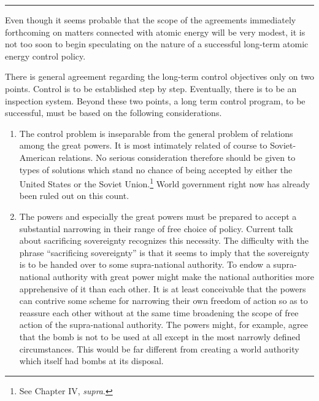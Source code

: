 \noindent\hfil\rule{0.4\textwidth}{.4pt}\hfil

\vspace{4pt}

Even though it seems probable that the scope of the agreements immediately forthcoming on matters connected with atomic energy will be very modest, it is not too soon to begin speculating on the nature of a successful long-term atomic energy control policy.

There is general agreement regarding the long-term control objectives only on two points. Control is to be established step by step. Eventually, there is to be an inspection system. Beyond these two points, a long term control program, to be successful, must be based on the following considerations.

\begin{enumerate}[1.]

\item The control problem is inseparable from the general problem of relations among the great powers. It is most intimately related of course to Soviet-American relations. No serious consideration therefore should be given to types of solutions which stand no chance of being accepted by either the United States or the Soviet Union.\footnote{See Chapter IV, \textit{supra}.} World government right now has already been ruled out on this count.

\item The powers and especially the great powers must be prepared to accept a substantial narrowing in their range of free choice of policy. Current talk about sacrificing sovereignty recognizes this necessity. The difficulty with the phrase ``sacrificing sovereignty'' is that it seems to imply that the sovereignty is to be handed over to some supra-national authority. To endow a supra-national authority with great power might make the national authorities more apprehensive of it than each other. It is at least conceivable that the powers can contrive some scheme for narrowing their own freedom of action so as to reassure each other without at the same time broadening the scope of free action of the supra-national authority. The powers might, for example, agree that the bomb is not to be used at all except in the most narrowly defined circumstances. This would be far different from creating a world authority which itself had bombs at its disposal.


\end{enumerate}
